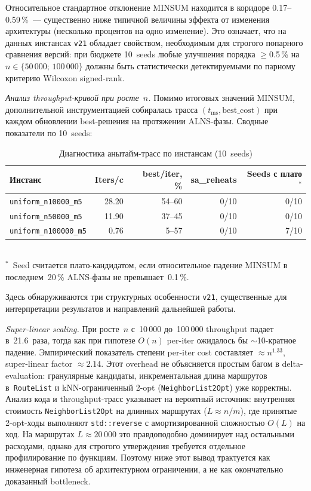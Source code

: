\documentclass[14pt,a4paper]{extarticle}
\begin{document}
Относительное стандартное отклонение MINSUM находится в коридоре 0.17--0.59\,\%~--- существенно ниже типичной величины эффекта от изменения архитектуры (несколько процентов на одно изменение). Это означает, что на данных инстансах \texttt{v21} обладает свойством, необходимым для строгого попарного сравнения версий: при бюджете 10~seeds любые улучшения порядка $\geq$0.5\,\% на $n \in \{50\,000;\,100\,000\}$ должны быть статистически детектируемыми по парному критерию Wilcoxon signed-rank.

\textit{Анализ throughput-кривой при росте~$n$.} Помимо итоговых значений MINSUM, дополнительной инструментацией собиралась трасса $(t_{\mathrm{ms}}, \mathrm{best\_cost})$ при каждом обновлении best-решения на протяжении ALNS-фазы. Сводные показатели по 10~seeds:

\begin{table}[H]
\centering
\caption{Диагностика анытайм-трасс по инстансам (10~seeds)}
\small
\begin{tabular}{lrrrr}
\toprule
Инстанс & Iters/c & best/iter, \% & sa\_reheats & Seeds с плато$^*$\\
\midrule
\texttt{uniform\_n10000\_m5}  & 28.20 & 54--60 & 0/10 & 0/10\\
\texttt{uniform\_n50000\_m5}  & 11.90 & 37--45 & 0/10 & 0/10\\
\texttt{uniform\_n100000\_m5} &  0.76 &  5--57 & 0/10 & 7/10\\
\bottomrule
\end{tabular}
\normalsize \\[2pt]
\footnotesize $^*$~Seed считается плато-кандидатом, если относительное падение MINSUM в последнем~20\,\% ALNS-фазы не превышает~0.1\,\%.
\end{table}

Здесь обнаруживаются три структурных особенности \texttt{v21}, существенные для интерпретации результатов и направлений дальнейшей работы.

\textit{Super-linear scaling.} При росте~$n$ с~10\,000 до~100\,000 throughput падает в~21.6~раза, тогда как при гипотезе $O(n)$ per-iter ожидалось бы $\sim$10-кратное падение. Эмпирический показатель степени per-iter cost составляет $\approx n^{1.33}$, super-linear factor $\approx 2.14$. Этот overhead не объясняется простым багом в delta-evaluation: гранулярные кандидаты, инкрементальная длина маршрутов в~\texttt{RouteList} и kNN-ограниченный 2-opt (\texttt{NeighborList2Opt}) уже корректны. Анализ кода и throughput-трасс указывает на вероятный источник: внутренняя стоимость \texttt{NeighborList2Opt} на длинных маршрутах ($L \approx n/m$), где принятые 2-opt-ходы выполняют \texttt{std::reverse} с амортизированной сложностью $O(L)$ на ход. На маршрутах $L \approx 20\,000$ это правдоподобно доминирует над остальными расходами, однако для строгого утверждения требуется отдельное профилирование по функциям. Поэтому ниже этот вывод трактуется как инженерная гипотеза об архитектурном ограничении, а не как окончательно доказанный bottleneck.
\end{document}
